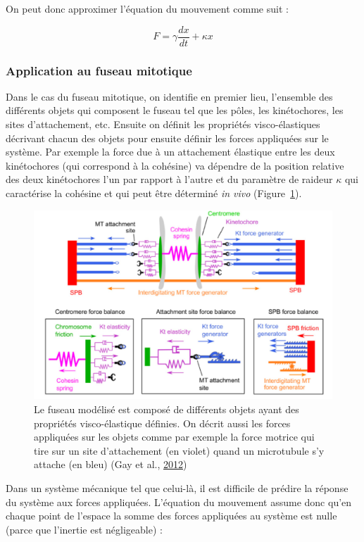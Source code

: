 \documentclass[12pt,a4paper,twoside,openright]{book}
\begin{document}
On peut donc approximer l'équation du mouvement comme suit :

\[
F = \gamma\frac{dx}{dt} + \kappa x
\]

\subsubsection{Application au fuseau
mitotique}\label{application-au-fuseau-mitotique}

Dans le cas du fuseau mitotique, on identifie en premier lieu,
l'ensemble des différents objets qui composent le fuseau tel que les
pôles, les kinétochores, les sites d'attachement, etc. Ensuite on
définit les propriétés visco-élastiques décrivant chacun des objets pour
ensuite définir les forces appliquées sur le système. Par exemple la
force due à un attachement élastique entre les deux kinétochores (qui
correspond à la cohésine) va dépendre de la position relative des deux
kinétochores l'un par rapport à l'autre et du paramètre de raideur
\(\kappa\) qui caractérise la cohésine et qui peut être déterminé
\emph{in vivo} (Figure~\ref{fig:spindle_model}).

\begin{figure}[htbp]
\centering
\includegraphics{figures/intro/spindle_model.png}
\caption[Modélisation mécanique du fuseau mitotique]{\label{fig:spindle_model}Le
fuseau modélisé est composé de différents objets ayant des propriétés
visco-élastique définies. On décrit aussi les forces appliquées sur les
objets comme par exemple la force motrice qui tire sur un site
d'attachement (en violet) quand un microtubule s'y attache (en bleu)
(Gay et al., \hyperref[ref-Gay2012a]{2012})}
\end{figure}

Dans un système mécanique tel que celui-là, il est difficile de prédire
la réponse du système aux forces appliquées. L'équation du mouvement
assume donc qu'en chaque point de l'espace la somme des forces
appliquées au système est nulle (parce que l'inertie est négligeable) :
\end{document}
